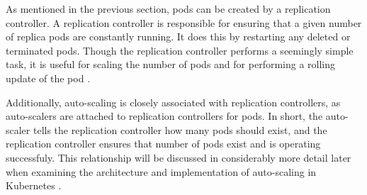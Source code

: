 As mentioned in the previous section, pods can be created by a replication
controller. A replication controller is responsible for ensuring that a given
number of replica pods are constantly running. It does this by restarting any
deleted or terminated pods. Though the replication controller performs a
seemingly simple task, it is useful for scaling the number of pods and for
performing a rolling update of the pod \cite{k8s-replication-controllers}.

Additionally, auto-scaling is closely associated with replication controllers, as
auto-scalers are attached to replication controllers for pods. In short, the
auto-scaler tells the replication controller how many pods should exist, and the
replication controller ensures that number of pods exist and is operating
successfuly. This relationship will be discussed in considerably more detail later when
examining the architecture and implementation of auto-scaling in Kubernetes
\cite{k8s-horizontal-pod-autoscaler-proposal}.
